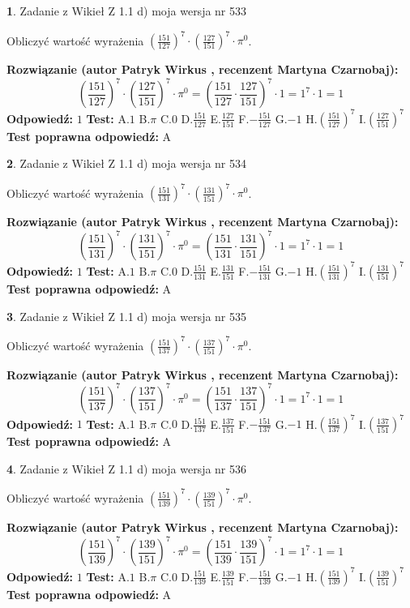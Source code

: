 \documentclass[12pt, a4paper]{article}
\theoremstyle{definition} %
\newtheorem{zad}{}
\newcommand{\zadStart}[1]{\begin{zad}#1\newline}
\newcommand{\zadStop}{\end{zad}}
\newcommand{\rozwStart}[2]{\noindent \textbf{Rozwiązanie (autor #1 , recenzent #2): }\newline}
\newcommand{\rozwStop}{\newline}
\newcommand{\odpStart}{\noindent \textbf{Odpowiedź:}\newline}
\newcommand{\odpStop}{\newline}
\newcommand{\testStart}{\noindent \textbf{Test:}\newline}
\newcommand{\testStop}{\newline}
\newcommand{\kluczStart}{\noindent \textbf{Test poprawna odpowiedź:}\newline}
\newcommand{\kluczStop}{\newline}
\begin{document}
\zadStart{Zadanie z Wikieł Z 1.1 d) moja wersja nr 533}

Obliczyć wartość wyrażenia $(\frac{151}{127})^{7} \cdot (\frac{127}{151})^{7} \cdot \pi^{0}$.
\zadStop
\rozwStart{Patryk Wirkus}{Martyna Czarnobaj}
$$(\frac{151}{127})^{7} \cdot (\frac{127}{151})^{7} \cdot \pi^{0} = (\frac{151}{127} \cdot \frac{127}{151})^{7} \cdot 1 = 1^{7} \cdot 1 = 1$$
\rozwStop
\odpStart
$1$
\odpStop
\testStart
A.$1$ B.$\pi$ C.$0$ D.$\frac{151}{127}$ E.$\frac{127}{151}$
F.$-\frac{151}{127}$ G.$-1$
H.$(\frac{151}{127})^{7}$
I.$(\frac{127}{151})^{7}$
\testStop
\kluczStart
A
\kluczStop



\zadStart{Zadanie z Wikieł Z 1.1 d) moja wersja nr 534}

Obliczyć wartość wyrażenia $(\frac{151}{131})^{7} \cdot (\frac{131}{151})^{7} \cdot \pi^{0}$.
\zadStop
\rozwStart{Patryk Wirkus}{Martyna Czarnobaj}
$$(\frac{151}{131})^{7} \cdot (\frac{131}{151})^{7} \cdot \pi^{0} = (\frac{151}{131} \cdot \frac{131}{151})^{7} \cdot 1 = 1^{7} \cdot 1 = 1$$
\rozwStop
\odpStart
$1$
\odpStop
\testStart
A.$1$ B.$\pi$ C.$0$ D.$\frac{151}{131}$ E.$\frac{131}{151}$
F.$-\frac{151}{131}$ G.$-1$
H.$(\frac{151}{131})^{7}$
I.$(\frac{131}{151})^{7}$
\testStop
\kluczStart
A
\kluczStop



\zadStart{Zadanie z Wikieł Z 1.1 d) moja wersja nr 535}

Obliczyć wartość wyrażenia $(\frac{151}{137})^{7} \cdot (\frac{137}{151})^{7} \cdot \pi^{0}$.
\zadStop
\rozwStart{Patryk Wirkus}{Martyna Czarnobaj}
$$(\frac{151}{137})^{7} \cdot (\frac{137}{151})^{7} \cdot \pi^{0} = (\frac{151}{137} \cdot \frac{137}{151})^{7} \cdot 1 = 1^{7} \cdot 1 = 1$$
\rozwStop
\odpStart
$1$
\odpStop
\testStart
A.$1$ B.$\pi$ C.$0$ D.$\frac{151}{137}$ E.$\frac{137}{151}$
F.$-\frac{151}{137}$ G.$-1$
H.$(\frac{151}{137})^{7}$
I.$(\frac{137}{151})^{7}$
\testStop
\kluczStart
A
\kluczStop



\zadStart{Zadanie z Wikieł Z 1.1 d) moja wersja nr 536}

Obliczyć wartość wyrażenia $(\frac{151}{139})^{7} \cdot (\frac{139}{151})^{7} \cdot \pi^{0}$.
\zadStop
\rozwStart{Patryk Wirkus}{Martyna Czarnobaj}
$$(\frac{151}{139})^{7} \cdot (\frac{139}{151})^{7} \cdot \pi^{0} = (\frac{151}{139} \cdot \frac{139}{151})^{7} \cdot 1 = 1^{7} \cdot 1 = 1$$
\rozwStop
\odpStart
$1$
\odpStop
\testStart
A.$1$ B.$\pi$ C.$0$ D.$\frac{151}{139}$ E.$\frac{139}{151}$
F.$-\frac{151}{139}$ G.$-1$
H.$(\frac{151}{139})^{7}$
I.$(\frac{139}{151})^{7}$
\testStop
\kluczStart
A
\kluczStop
\end{document}
